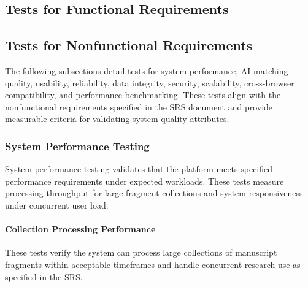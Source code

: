 \documentclass[12pt, titlepage]{article}
\begin{document}
\subsection{Tests for Functional Requirements}


\subsection{Tests for Nonfunctional Requirements}

The following subsections detail tests for system performance, AI matching quality, usability, reliability, data integrity, security, scalability, cross-browser compatibility, and performance benchmarking. These tests align with the nonfunctional requirements specified in the SRS document and provide measurable criteria for validating system quality attributes.

\subsubsection{System Performance Testing}

System performance testing validates that the platform meets specified performance requirements under expected workloads. These tests measure processing throughput for large fragment collections and system responsiveness under concurrent user load.

\paragraph{Collection Processing Performance}

These tests verify the system can process large collections of manuscript fragments within acceptable timeframes and handle concurrent research use as specified in the SRS.
\end{document}
